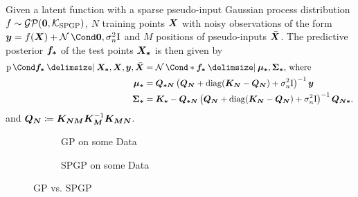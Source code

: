 \begin{lemma}
    \label{lem:spgp_posterior}
    Given a latent function with a sparse pseudo-input Gaussian process distribution $f \sim \operatorname{\mathcal{GP}}(\bm{0}, \operatorname{\mathcal{K}}_{\text{SPGP}})$, $N$ training points $\bm{X}$ with noisy observations of the form $\mat{y} = f(\mat{X}) + \Gaussian{\mat{0}, \sigma_n^2 \Eye}$ and $M$ positions of pseudo-inputs $\bar{\bm{X}}$.
    The predictive posterior $\bm{f_\ast}$ of the test points $\bm{X_\ast}$ is then given by
    \begin{align}
        \Prob{\mat{f_\ast} \given \mat{X_\ast}, \mat{X}, \mat{y}, \ps{\mat{X}}} &= \Gaussian*{\mat{f_\ast} \given \mat{\mu_\ast}, \mat{\Sigma_\ast}} \text{, where} \\
        \mat{\mu_\ast} &= \mat{Q_{\ast N}} \left( \mat{Q_N} + \diag(\mat{K_N} - \mat{Q_N}) + \sigma_n^2 \Eye \right)^{-1} \mat{y} \\
        \mat{\Sigma_\ast} &= \mat{K_\ast} - \mat{Q_{\ast N}} \left( \mat{Q_N} + \diag(\mat{K_N} - \mat{Q_N}) + \sigma_n^2 \Eye \right)^{-1} \mat{Q_{N \ast}}.
    \end{align}
    and $\bm{Q_N} \coloneqq \bm{K_{N M}} \bm{K_M}^{-1} \bm{K_{M N}}$.
\end{lemma}
\begin{figure}[t]
    \centering
    \begin{subfigure}{\subfigurewidth}
        \caption{GP on some Data}
        \label{fig:spgp_example:gp}
    \end{subfigure}
    \begin{subfigure}{\subfigurewidth}
        \caption{SPGP on some Data}
        \label{fig:spgp_example:spgp}
    \end{subfigure}
    \caption{GP vs. SPGP}
    \label{fig:spgp_example}
\end{figure}


